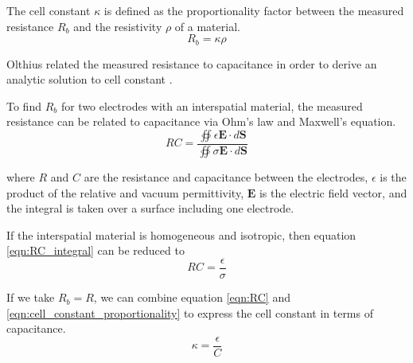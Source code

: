   \par The cell constant $\kappa$ is defined as the proportionality factor between the measured resistance $R_b$ and the resistivity $\rho$ of a material.
  \begin{equation}
      R_b = \kappa \rho
      \label{eqn:cell_constant_proportionality}
  \end{equation}
  
  \noindent  Olthius related the measured resistance to capacitance in order to derive an analytic solution to cell constant \cite{olthuis_theoretical_1995}. 
  
  \par To find $R_b$ for two electrodes with an interspatial material, the measured resistance can be related to capacitance via Ohm's law and Maxwell's equation.
  \begin{equation}
      RC = \frac{\oiint \epsilon \boldsymbol{E} \cdot d\boldsymbol{S}}{\oiint \sigma\boldsymbol{E}\cdot d\boldsymbol{S}}
      \label{eqn:RC_integral}
  \end{equation}
  
  \noindent where $R$ and $C$ are the resistance and capacitance between the electrodes, $\epsilon$ is the product of the relative and vacuum permittivity, $\boldsymbol{E}$ is the electric field vector, and the integral is taken over a surface including one electrode.
  
  \par If the interspatial material is homogeneous and isotropic, then equation \ref{eqn:RC_integral} can be reduced to
  \begin{equation}
      RC = \frac{\epsilon}{\sigma}
      \label{eqn:RC}
  \end{equation}
  
  \par If we take $R_b = R$, we can combine equation \ref{eqn:RC} and \ref{eqn:cell_constant_proportionality} to express the cell constant in terms of capacitance.
  \begin{equation}
      \kappa = \frac{\epsilon}{C}
      \label{eqn:cell_constant_C}
  \end{equation}
  
